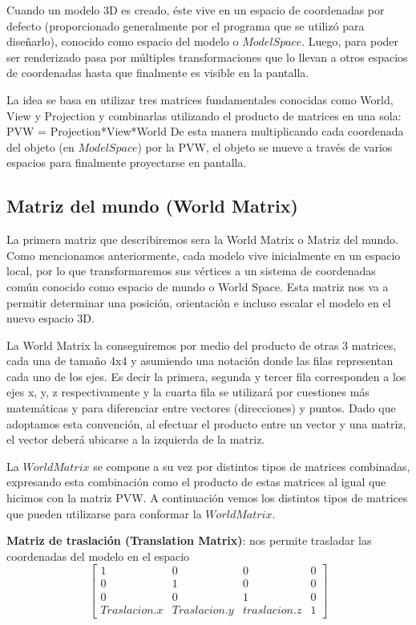 \documentclass[a4paper]{article}
\begin{document}
\par Cuando un modelo 3D es creado, éste vive en un espacio de coordenadas por defecto (proporcionado generalmente por el programa que se utilizó para diseñarlo), conocido como espacio del modelo o $Model Space$. Luego, para poder ser renderizado pasa por múltiples transformaciones que lo llevan a otros espacios de coordenadas hasta que finalmente es visible en la pantalla. 
\par La idea se basa en utilizar tres matrices fundamentales conocidas como World, View y Projection y combinarlas utilizando el producto de matrices en una sola: 
PVW = Projection*View*World
De esta manera  multiplicando cada coordenada del objeto (en $Model Space$) por la PVW, el objeto se mueve a través de varios espacios para finalmente proyectarse en pantalla.

 
\subsection{Matriz del mundo (World Matrix)}
La primera matriz que describiremos sera la  World Matrix o Matriz del mundo.
Como mencionamos anteriormente, cada modelo vive inicialmente en un espacio local,  por lo que transformaremos sus vértices a un sistema de coordenadas común conocido como espacio de mundo o World Space. Esta matriz nos va a permitir determinar una posición,  orientación e incluso escalar el modelo en el nuevo espacio 3D.
\par La World Matrix la conseguiremos por medio del producto de otras 3 matrices, cada una de tamaño 4x4 y asumiendo una notación donde las filas representan cada uno de los ejes. Es decir la primera, segunda y tercer fila corresponden a los ejes x, y, z respectivamente y la cuarta fila se utilizará por cuestiones más matemáticas y para diferenciar entre vectores (direcciones) y puntos. Dado que adoptamos esta convención, al efectuar el producto entre un vector y una matriz, el vector deberá ubicarse a la izquierda de la matriz.
\par La $World Matrix$ se compone a su vez por distintos tipos de matrices combinadas, expresando esta combinación como el producto de estas matrices al igual que hicimos con la matriz PVW. A continuación vemos los distintos tipos de matrices que pueden utilizarse para conformar la $World Matrix$.


\textbf{Matriz de traslación (Translation Matrix)}: nos permite trasladar las coordenadas del modelo en el espacio   
 \[
\begin{bmatrix}
1 & 0 & 0 & 0 \\
0 & 1 & 0 & 0 \\
0 & 0 & 1 & 0 \\
Traslacion.x & Traslacion.y & traslacion.z & 1  
\end{bmatrix}
\]
\end{document}
